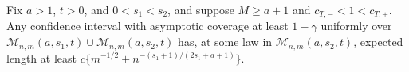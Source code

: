 Fix \(a>1\), \(t>0\), and \(0<s_1<s_2\), and suppose \(M\ge a+1\) and \(c_{T,-}<1<c_{T,+}\). Any confidence interval with asymptotic coverage at least \(1-\gamma\) uniformly over \(\mathcal M_{n,m}(a,s_1,t)\cup\mathcal M_{n,m}(a,s_2,t)\) has, at some law in \(\mathcal M_{n,m}(a,s_2,t)\), expected length at least \(c\{m^{-1/2}+n^{-(s_1+1)/(2s_1+a+1)}\}\).